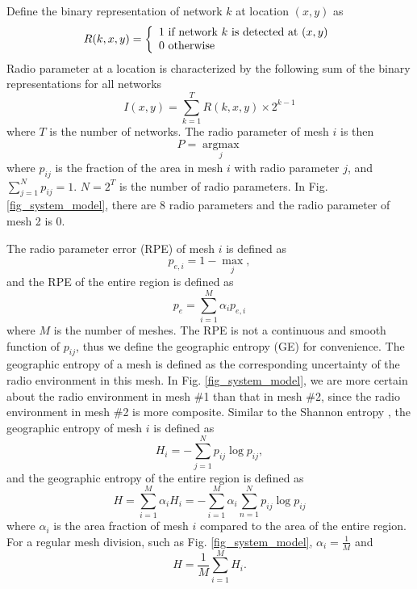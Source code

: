 \documentclass[conference]{IEEEtran}
\begin{document}
Define the binary representation of network $k$ at location $(x,y)$ as
\begin{equation}
\label{eq_binary_representation}
R{\rm{(}}k,x,y{\rm{)}} = \left\{ \begin{array}{l}
1 \mbox{ if network } k \mbox{ is detected at }(x,y)\\
0 \mbox{ otherwise}\\
\end{array} \right.
\end{equation}
Radio parameter at a location is characterized by the following sum of the binary representations for all networks \cite{CPC_Ondemand}
\begin{equation}\label{eq_radio_parameters}
I(x,y) = \sum \limits_{k = 1}^T {R(k,x,y) \times 2^{k - 1} }
\end{equation}
where $T$ is the number of networks.
The radio parameter of mesh $i$ is then
\begin{equation}\label{eq_radio_parameter_majority}
P = \mathop {\arg\max {p_{ij}}}\limits_j
\end{equation}
where $p_{ij}$ is the fraction of the area in mesh $i$ with radio parameter $j$,
and $\sum\nolimits_{j = 1}^N {{p_{ij}}} = 1$.
$N=2^T$ is the number of radio parameters.
In Fig. \ref{fig_system_model}, there are $8$ radio parameters and the radio parameter of mesh 2 is 0.

The radio parameter error (RPE) of mesh $i$ is defined as
\begin{equation}\label{eq_pe_definition}
{p_{e,i}} = 1 - \mathop {\max {p_{ij}}}\limits_j,
\end{equation}
and the RPE of the entire region is defined as
\begin{equation}
{p_e} = \sum\limits_{i = 1}^M {{\alpha _i}{p_{e,i}}}
\end{equation}
where $M$ is the number of meshes.
The RPE is not a continuous and smooth function of $p_{ij}$, thus we define the geographic entropy (GE) for convenience.
The geographic entropy of a mesh is defined as the corresponding uncertainty of the radio environment in this mesh.
In Fig. \ref{fig_system_model}, we are more certain about the radio environment in mesh \#1 than that in mesh \#2, since the radio environment
in mesh \#2 is more composite.
Similar to the Shannon entropy \cite{Cover}, the geographic entropy of mesh $i$ is defined as
\begin{equation}\label{GEmesh}
{H_i} =  - \sum\limits_{j = 1}^N {{p_{ij}}\log {p_{ij}}},
\end{equation}
and the geographic entropy of the entire region is defined as
\begin{equation}
H = \sum\limits_{i = 1}^M {{\alpha _i}{H_i}}  =  - \sum\limits_{i = 1}^M {{\alpha
_i}\sum\limits_{n = 1}^N {{p_{ij}}\log {p_{ij}}} }
\end{equation}
where $\alpha _i$ is the area fraction of mesh $i$ compared to the area of the entire region.
For a regular mesh division, such as Fig. \ref{fig_system_model}, ${\alpha _i} = \frac{1}{M}$ and
\begin{equation}\label{eq_entropy_rate}
H = \frac{1}{M}\sum\limits_{i = 1}^M {{H_i}}.
\end{equation}
\end{document}
